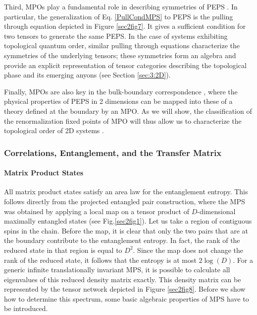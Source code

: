 \documentclass[rmp,aps,reprint,superscriptaddress,nobalancelastpage]{revtex4-1}
\begin{document}
Third, MPOs play a fundamental role in describing symmetries of PEPS \cite{chen:2d-spt-phases-peps-ghz,sahinoglu:mpo-injectivity,bultinck:mpo-anyons}.  In particular, the generalization of Eq. \eqref{PullCondMPS} to PEPS is the pulling through equation depicted in Figure \ref{sec2fig7}. It gives a sufficient condition for two tensors to  generate the same PEPS. In the case of systems exhibiting topological quantum order, similar pulling through equations characterize the symmetries of the underlying tensors; these symmetries form an algebra and provide an explicit representation of  tensor categories describing the topological phase and its emerging anyons (see Section \ref{sec:3:2D}).



Finally, MPOs are also key in the bulk-boundary correspondence \cite{cirac:peps-boundaries}, where the physical properties of PEPS in 2 dimensions can be mapped into these of a theory defined at the boundary by an MPO. As we will show, the classification of the renormalization fixed points of MPO will thus allow us to characterize the topological order of 2D systems \cite{cirac:mpdo-rgfp}.


\subsubsection{Correlations, Entanglement, and the Transfer Matrix\label{sec2TN3}\label{sec:2:CorrsTOp}}

\paragraph{Matrix Product States}
All matrix product states satisfy an area law for the entanglement entropy. This follows directly from the projected entangled pair construction, where the MPS was obtained by applying a local map on a tensor product of $D$-dimensional maximally entangled states (see Fig.\ref{sec2fig1}). Let us take a region of contiguous spins in the chain. Before the map, it is clear that only the two pairs that are at the boundary contribute to the entanglement entropy. In fact, the rank of the reduced state in that region is equal to $D^2$. Since the map does not change the rank of the reduced state, it follows that the entropy is at most $2\log(D)$. For a generic infinite translationally invariant MPS, it is possible to calculate all eigenvalues of this reduced density matrix exactly. This density matrix can be represented by the tensor network depicted in Figure \ref{sec2fig8}. Before we show how to determine this spectrum, some basic algebraic properties of MPS have to be introduced.
\end{document}

